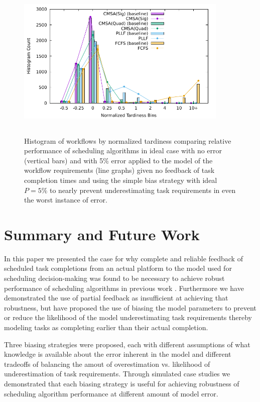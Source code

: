\documentclass[10pt]{csce}
\begin{document}
\begin{figure}
	\begin{center}
		\includegraphics[width=0.9\textwidth,height=3in]{figures/Histogram_All_CompleteMediumAllUniformError_WithBias.pdf}
	\end{center}
	\caption{Histogram of workflows by normalized tardiness comparing
		relative performance of scheduling algorithms in ideal case with no
		error (vertical bars) and with 5\% error applied to the model of the
		workflow requirements (line graphs) given no feedback of task
		completion times and using the simple bias strategy with ideal
		$P=5\%$ to nearly prevent underestimating task requirements in even the
		worst instance of error.}
	\label{fig:nofeedback-sbias-mederror}
\end{figure}

\section{Summary and Future Work}
\label{sec:Summary}

In this paper we presented the case for why complete and reliable feedback
of scheduled task completions from an actual platform to the model used for
scheduling decision-making was found to be necessary to achieve robust
performance of scheduling algorithms in previous work \cite{pdpta18}.
Furthermore we have demonstrated the use of partial feedback as insufficient
at achieving that robustness, but have proposed the use of biasing the model
parameters to prevent or reduce the likelihood of the model underestimating
task requirements thereby modeling tasks as completing earlier than their
actual completion.

Three biasing strategies were proposed, each with different assumptions of
what knowledge is available about the error inherent in the model and
different tradeoffs of balancing the amout of overestimation vs. likelihood
of underestimation of task requirements.  Through simulated case studies we
demonstrated that each biasing strategy is useful for achieving robustness
of scheduling algorithm performance at different amount of model error.
\end{document}
